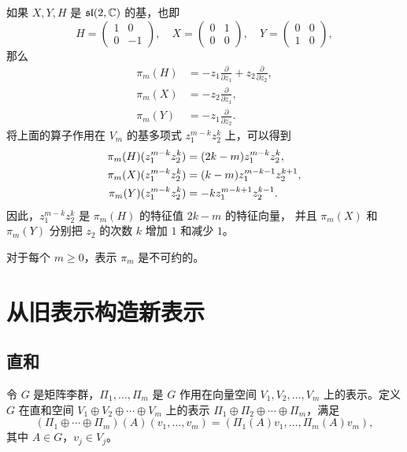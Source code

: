 \begin{example}
  如果 $X,Y,H$ 是 $\mathfrak{sl}(2,\mathbb{C})$ 的基，也即
  \[
    H=\begin{pmatrix}
      1 & 0 \\
      0 & -1
    \end{pmatrix},\quad
    X=\begin{pmatrix}
      0 & 1 \\
      0 & 0
    \end{pmatrix},\quad
    Y=\begin{pmatrix}
      0 & 0 \\ 
      1 & 0
    \end{pmatrix},
  \]
  那么 
  \begin{align*}
    \pi_m(H)&=-z_1\frac{\partial}{\partial z_1}+z_2\frac{\partial}{\partial z_2},\\
    \pi_m(X)&=-z_2\frac{\partial}{\partial z_1},\\
    \pi_m(Y)&=-z_1\frac{\partial}{\partial z_2}.
  \end{align*}
  将上面的算子作用在 $V_m$ 的基多项式 $z_1^{m-k}z_2^k$ 上，可以得到
  \begin{align}
    \pi_m(H)(z_1^{m-k}z_2^k)&=(2k-m)z_1^{m-k}z_2^k,\notag \\
    \pi_m(X)(z_1^{m-k}z_2^k)&= (k-m) z_1^{m-k-1}z_2^{k+1},\notag \\
    \pi_m(Y)(z_1^{m-k}z_2^k)&= -k z_1^{m-k+1}z_2^{k-1}.
  \end{align}
  因此，$z_1^{m-k}z_2^k$ 是 $\pi_m(H)$ 的特征值 $2k-m$ 的特征向量，
  并且 $\pi_m(X)$ 和 $\pi_m(Y)$ 分别把 $z_2$ 的次数 $k$ 增加 $1$ 和减少 $1$。
\end{example}

\begin{proposition}
  对于每个 $m\geq 0$，表示 $\pi_m$ 是不可约的。
\end{proposition}

\section{从旧表示构造新表示}

\subsection{直和}

\begin{definition}
  令 $G$ 是矩阵李群，$\Pi_1,\dots,\Pi_m$ 是 $G$ 作用在向量空间 $V_1,V_2,\dots,V_m$
  上的表示。定义 $G$ 在直和空间 $V_1\oplus V_2\oplus \cdots \oplus V_m$ 上的表示
  $\Pi_1\oplus \Pi_2\oplus \cdots \oplus \Pi_m$，满足
  \[
    (\Pi_1\oplus \cdots \oplus \Pi_m)(A)(v_1,\dots,v_m)
    =(\Pi_1(A)v_1,\dots,\Pi_m(A)v_m),
  \]
  其中 $A\in G$，$v_j\in V_j$。
\end{definition}

